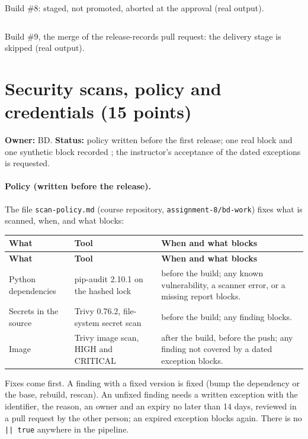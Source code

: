 \begin{longlisting}
\inputminted[fontsize=\scriptsize]{text}{evidence/222-build-8-merge-of-pr-22-staged-not-promoted-aborted-bd-2026-11-17.txt}
\caption{Build \#8: staged, not promoted, aborted at the approval (real output).}
\label{Listing:E222}
\end{longlisting}

\begin{longlisting}
\inputminted[fontsize=\scriptsize]{text}{evidence/223-build-9-release-records-pr-19-delivery-skipped-by-changeset-bd-2026-11-17.txt}
\caption{Build \#9, the merge of the release-records pull request: the delivery stage is skipped (real output).}
\label{Listing:E223}
\end{longlisting}


\section{Security scans, policy and credentials (15 points)}\label{Section:deliveryScans}
\textbf{Owner:} BD. \textbf{Status:} policy written before the first release; one real block and one synthetic block recorded \StatusPass; the instructor's acceptance of the dated exceptions is requested.

\paragraph{Policy (written before the release).} The file \texttt{scan-policy.md} (course repository, \texttt{assignment-8/bd-work}) fixes what is scanned, when, and what blocks:
\begin{tabularx}{\linewidth}{L{3.2cm}L{3.2cm}Y}
\caption{Scan policy\label{Table:ScanPolicy}}\\
\toprule \textbf{What} & \textbf{Tool} & \textbf{When and what blocks}\\ \midrule
\endfirsthead
\toprule \textbf{What} & \textbf{Tool} & \textbf{When and what blocks}\\ \midrule
\endhead \bottomrule \endlastfoot
Python dependencies & pip-audit 2.10.1 on the hashed lock & before the build; any known vulnerability, a scanner error, or a missing report blocks.\\
Secrets in the source & Trivy 0.76.2, file-system secret scan & before the build; any finding blocks.\\
Image & Trivy image scan, HIGH and CRITICAL & after the build, before the push; any finding not covered by a dated exception blocks.\\
\end{tabularx}
Fixes come first. A finding with a fixed version is fixed (bump the dependency or the base, rebuild, rescan). An unfixed finding needs a written exception with the identifier, the reason, an owner and an expiry no later than 14 days,
reviewed in a pull request by the other person; an expired exception blocks again. There is no \texttt{|| true} anywhere in the pipeline.

